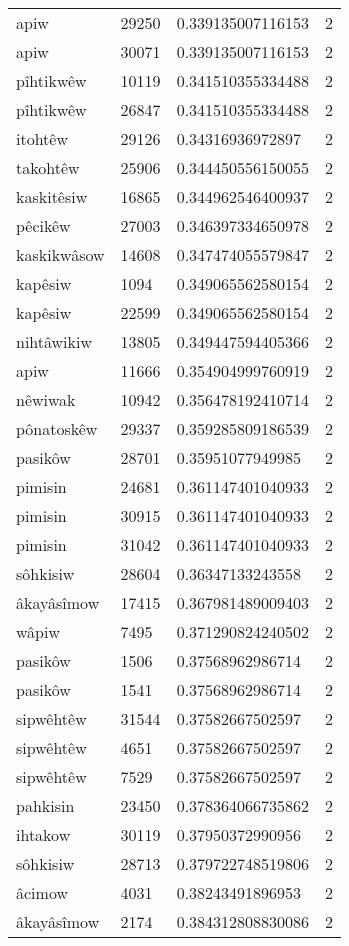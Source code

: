 \begin{longtable}{llll}
apiw & 29250 & 0.339135007116153 & 2 \\
apiw & 30071 & 0.339135007116153 & 2 \\
pîhtikwêw & 10119 & 0.341510355334488 & 2 \\
pîhtikwêw & 26847 & 0.341510355334488 & 2 \\
itohtêw & 29126 & 0.34316936972897 & 2 \\
takohtêw & 25906 & 0.344450556150055 & 2 \\
kaskitêsiw & 16865 & 0.344962546400937 & 2 \\
pêcikêw & 27003 & 0.346397334650978 & 2 \\
kaskikwâsow & 14608 & 0.347474055579847 & 2 \\
kapêsiw & 1094 & 0.349065562580154 & 2 \\
kapêsiw & 22599 & 0.349065562580154 & 2 \\
nihtâwikiw & 13805 & 0.349447594405366 & 2 \\
apiw & 11666 & 0.354904999760919 & 2 \\
nêwiwak & 10942 & 0.356478192410714 & 2 \\
pônatoskêw & 29337 & 0.359285809186539 & 2 \\
pasikôw & 28701 & 0.35951077949985 & 2 \\
pimisin & 24681 & 0.361147401040933 & 2 \\
pimisin & 30915 & 0.361147401040933 & 2 \\
pimisin & 31042 & 0.361147401040933 & 2 \\
sôhkisiw & 28604 & 0.36347133243558 & 2 \\
âkayâsîmow & 17415 & 0.367981489009403 & 2 \\
wâpiw & 7495 & 0.371290824240502 & 2 \\
pasikôw & 1506 & 0.37568962986714 & 2 \\
pasikôw & 1541 & 0.37568962986714 & 2 \\
sipwêhtêw & 31544 & 0.37582667502597 & 2 \\
sipwêhtêw & 4651 & 0.37582667502597 & 2 \\
sipwêhtêw & 7529 & 0.37582667502597 & 2 \\
pahkisin & 23450 & 0.378364066735862 & 2 \\
ihtakow & 30119 & 0.37950372990956 & 2 \\
sôhkisiw & 28713 & 0.379722748519806 & 2 \\
âcimow & 4031 & 0.38243491896953 & 2 \\
âkayâsîmow & 2174 & 0.384312808830086 & 2 \\

\end{longtable}
